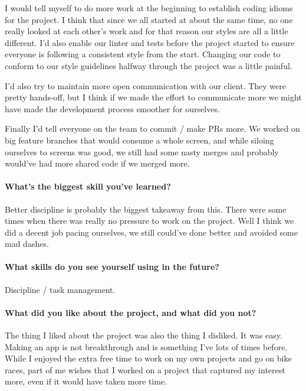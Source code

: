 I would tell myself to do more work at the beginning to establish coding
idioms for the project. I think that since we all started at about the
same time, no one really looked at each other's work and for that reason
our styles are all a little different. I'd also enable our linter and
tests before the project started to ensure everyone is following a
consistent style from the start. Changing our code to conform to our
style guidelines halfway through the project was a little painful.

I'd also try to maintain more open communication with our client. They
were pretty hands-off, but I think if we made the effort to communicate
more we might have made the development process smoother for ourselves.

Finally I'd tell everyone on the team to commit / make PRs more. We
worked on big feature branches that would consume a whole screen, and
while siloing ourselves to screens was good, we still had some nasty
merges and probably would've had more shared code if we merged more.

\paragraph{What's the biggest skill you've
learned?}\label{whats-the-biggest-skill-youve-learned}

Better discipline is probably the biggest takeaway from this. There were
some times when there was really no pressure to work on the project.
Well I think we did a decent job pacing ourselves, we still could've
done better and avoided some mad dashes.

\paragraph{What skills do you see yourself using in the
future?}\label{what-skills-do-you-see-yourself-using-in-the-future}

Discipline / task management.

\paragraph{What did you like about the project, and what did you
not?}\label{what-did-you-like-about-the-project-and-what-did-you-not}

The thing I liked about the project was also the thing I disliked. It
was easy. Making an app is not breakthrough and is something I've lots
of times before. While I enjoyed the extra free time to work on my own
projects and go on bike races, part of me wishes that I worked on a
project that captured my interest more, even if it would have taken more
time.

